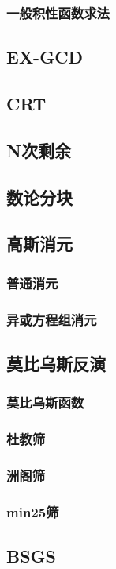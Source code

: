 \documentclass[twocolumn,a4]{article}
\newcommand{\addcpp}[1]{}
\begin{document}
		\subsubsection{一般积性函数求法}
	\subsection{EX-GCD}
	\subsection{CRT}
	\subsection{N次剩余}
	\subsection{数论分块}
	\subsection{高斯消元}
		\subsubsection{普通消元}
		\subsubsection{异或方程组消元}
	\subsection{莫比乌斯反演}
		\subsubsection{莫比乌斯函数}
		\subsubsection{杜教筛}
		\subsubsection{洲阁筛}
		\subsubsection{min25筛}
	\subsection{BSGS}
\end{document}
